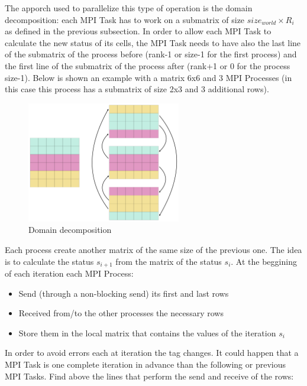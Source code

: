\documentclass[
  letterpaper,
  DIV=11,
  numbers=noendperiod]{scrartcl}
\providecommand{\tightlist}{%
  \setlength{\itemsep}{0pt}\setlength{\parskip}{0pt}}\usepackage{longtable,booktabs,array}
\begin{document}
The apporch used to parallelize this type of operation is the domain
decomposition: each MPI Task has to work on a submatrix of size
\(size_{world}\times R_i\) as defined in the previous subsection. In
order to allow each MPI Task to calculate the new status of its cells,
the MPI Task needs to have also the last line of the submatrix of the
process before (rank-1 or size-1 for the first process) and the first
line of the submatrix of the process after (rank+1 or 0 for the process
size-1). Below is shown an example with a matrix 6x6 and 3 MPI Processes
(in this case this process has a submatrix of size 2x3 and 3 additional
rows).

\begin{figure}

{\centering \includegraphics[width=\textwidth,height=2.08333in]{img/domain_decomposition_static.png}

}

\caption{Domain decomposition}

\end{figure}

Each process create another matrix of the same size of the previous one.
The idea is to calculate the status \(s_{i+1}\) from the matrix of the
status \(s_{i}\). At the beggining of each iteration each MPI Process:

\begin{itemize}
\tightlist
\item
  Send (through a non-blocking send) its first and last rows
\item
  Received from/to the other processes the necessary rows
\item
  Store them in the local matrix that contains the values of the
  iteration \(s_i\)
\end{itemize}

In order to avoid errors each at iteration the tag changes. It could
happen that a MPI Task is one complete iteration in advance than the
following or previous MPI Tasks. Find above the lines that perform the
send and receive of the rows:
\end{document}
